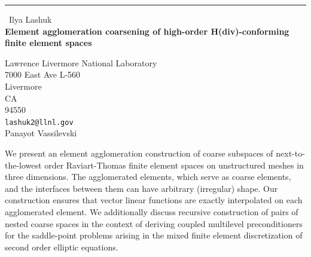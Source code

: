\documentclass{report}
\begin{document}
\begin{center}
\rule{6in}{1pt} \
{\large Ilya Lashuk \\
{\bf Element agglomeration coarsening of high-order H(div)-conforming finite element spaces}}

Lawrence Livermore National Laboratory \\ 7000 East Ave L-560 \\ Livermore \\ CA \\ 94550
\\
{\tt lashuk2@llnl.gov}\\
Panayot Vassilevski\end{center}

We present an element agglomeration construction of coarse subspaces of
next-to-the-lowest order Raviart-Thomas finite element spaces on
unstructured meshes in three dimensions. The agglomerated elements, which
serve as coarse elements, and the interfaces between them can have
arbitrary (irregular) shape. Our construction ensures that vector linear
functions are exactly interpolated on each agglomerated element. We
additionally discuss recursive construction of pairs of nested coarse
spaces in the context of deriving coupled multilevel preconditioners for
the saddle-point problems arising in the mixed finite element
discretization of second order elliptic equations.
\end{document}
